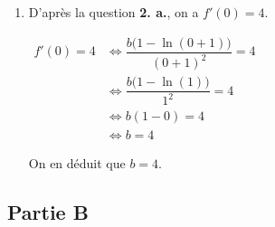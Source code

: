 \documentclass[10pt]{article}
\begin{document}
\begin{enumerate}
\begin{enumerate}
			$f'(x)=0 + \dfrac{b \times \dfrac{1}{x+1}\times (x+1) - 1 \times b\ln(x+1)}{(x+1)^2}
			=\dfrac{b - b\ln(x+1)}{(x+1)^2} =
			\dfrac{b\big(1-\ln (x+1)\big)}{(x+1)^{2}}$

			\item D'après la question \textbf{2. a.}, on a $f'(0) = 4$.

			$\begin{aligned}
				f'(0) = 4
					&\iff \dfrac{b\big(1-\ln (0+1)\big)}{(0+1)^{2}} = 4\\
					&\iff \dfrac{b\big(1 - \ln(1)\big)}{1^2} = 4\\
					&\iff b(1 - 0) = 4\\
					&\iff b = 4
			\end{aligned}$

			On en déduit que \quad $b = 4$.
		\end{enumerate}
	\end{enumerate}

	\subsection*{Partie B}
\end{document}
